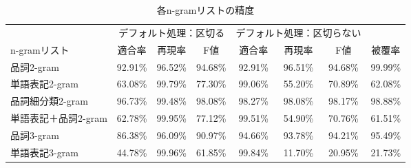 \begin{table}
  \begin{center}
    \caption{各n-gramリストの精度}
    
    
    
    \label{tab:n-gram1つ}
    \begin{tabular}{l|c|c|c|c|c|c|c|}
      ~                    & \multicolumn{3}{c|}{デフォルト処理：区切る}
      &                      \multicolumn{3}{c|}{デフォルト処理：区切らない}\\
      \cline{2-7}
      n-gramリスト         & 適合率  & 再現率  & F値
      &                      適合率  & 再現率  & F値     & 被覆率\\
      \hline
      品詞2-gram           & 92.91\% & 96.52\% & 94.68\%
      &                      92.91\% & 96.51\% & 94.68\% & 99.99\%\\
      単語表記2-gram       & 63.08\% & 99.79\% & 77.30\%
      &                      99.06\% & 55.20\% & 70.89\% & 62.08\%\\
      品詞細分類2-gram     & 96.73\% & 99.48\% & 98.08\%
      &                      98.27\% & 98.08\% & 98.17\% & 98.88\%\\
      単語表記＋品詞2-gram & 62.78\% & 99.95\% & 77.12\%
      &                      99.51\% & 54.90\% & 70.76\% & 61.51\%\\
      品詞3-gram           & 86.38\% & 96.09\% & 90.97\%
      &                      94.66\% & 93.78\% & 94.21\% & 95.49\%\\
      単語表記3-gram       & 44.78\% & 99.96\% & 61.85\%
      &                      99.84\% & 11.70\% & 20.95\% & 21.73\%\\
    \end{tabular}
  \end{center}
\end{table}

